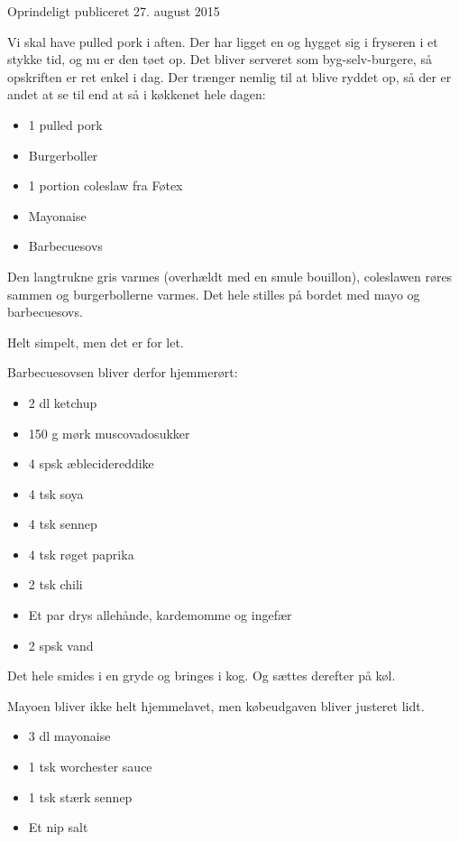 \documentclass[
  letterpaper,
  DIV=11,
  numbers=noendperiod]{scrreprt}
\providecommand{\tightlist}{%
  \setlength{\itemsep}{0pt}\setlength{\parskip}{0pt}}\usepackage{longtable,booktabs,array}
\begin{document}
Oprindeligt publiceret 27. august 2015

Vi skal have pulled pork i aften. Der har ligget en og hygget sig i
fryseren i et stykke tid, og nu er den tøet op. Det bliver serveret som
byg-selv-burgere, så opskriften er ret enkel i dag. Der trænger nemlig
til at blive ryddet op, så der er andet at se til end at så i køkkenet
hele dagen:

\begin{itemize}
\tightlist
\item
  1 pulled pork
\item
  Burgerboller
\item
  1 portion coleslaw fra Føtex
\item
  Mayonaise
\item
  Barbecuesovs
\end{itemize}

Den langtrukne gris varmes (overhældt med en smule bouillon), coleslawen
røres sammen og burgerbollerne varmes. Det hele stilles på bordet med
mayo og barbecuesovs.~

Helt simpelt, men det er for let.

Barbecuesovsen bliver derfor hjemmerørt:

\begin{itemize}
\tightlist
\item
  2 dl ketchup
\item
  150 g mørk muscovadosukker
\item
  4 spsk æblecidereddike
\item
  4 tsk soya
\item
  4 tsk sennep
\item
  4 tsk røget paprika
\item
  2 tsk chili
\item
  Et par drys allehånde, kardemomme og ingefær
\item
  2 spsk vand
\end{itemize}

Det hele smides i en gryde og bringes i kog. Og sættes derefter på køl.

Mayoen bliver ikke helt hjemmelavet, men købeudgaven bliver justeret
lidt.

\begin{itemize}
\tightlist
\item
  3 dl mayonaise
\item
  1 tsk worchester sauce
\item
  1 tsk stærk sennep
\item
  Et nip salt
\end{itemize}
\end{document}

